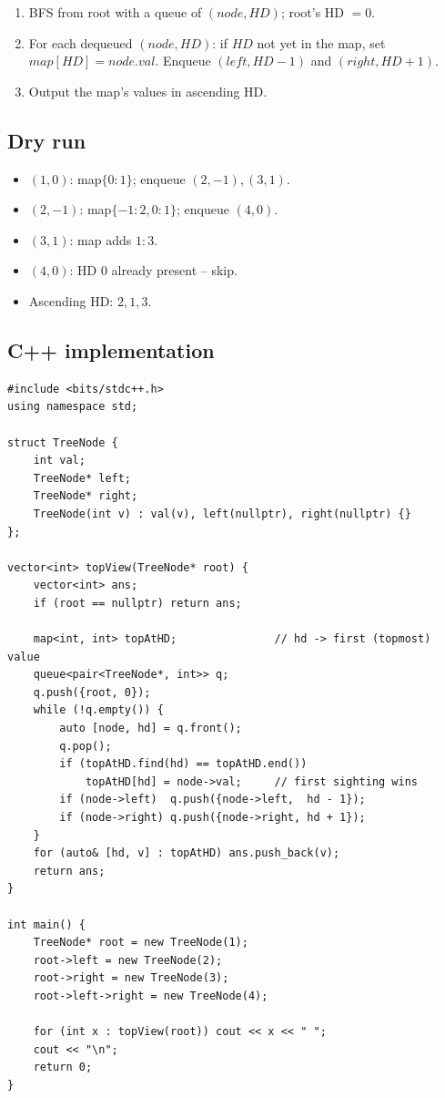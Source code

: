 \begin{enumerate}
  \item BFS from root with a queue of $(node, HD)$; root's HD $=0$.
  \item For each dequeued $(node, HD)$: if $HD$ not yet in the map, set
        $\textit{map}[HD]=node.val$. Enqueue $(left, HD-1)$ and
        $(right, HD+1)$.
  \item Output the map's values in ascending HD.
\end{enumerate}

\subsection*{Dry run}


\begin{itemize}
  \item $(1,0)$: map$\{0\!:\!1\}$; enqueue $(2,-1),(3,1)$.
  \item $(2,-1)$: map$\{-1\!:\!2,0\!:\!1\}$; enqueue $(4,0)$.
  \item $(3,1)$: map adds $1\!:\!3$.
  \item $(4,0)$: HD $0$ already present -- skip.
  \item Ascending HD: $2,1,3$.
\end{itemize}

\subsection*{C++ implementation}

\begin{lstlisting}
#include <bits/stdc++.h>
using namespace std;

struct TreeNode {
    int val;
    TreeNode* left;
    TreeNode* right;
    TreeNode(int v) : val(v), left(nullptr), right(nullptr) {}
};

vector<int> topView(TreeNode* root) {
    vector<int> ans;
    if (root == nullptr) return ans;

    map<int, int> topAtHD;               // hd -> first (topmost) value
    queue<pair<TreeNode*, int>> q;
    q.push({root, 0});
    while (!q.empty()) {
        auto [node, hd] = q.front();
        q.pop();
        if (topAtHD.find(hd) == topAtHD.end())
            topAtHD[hd] = node->val;     // first sighting wins
        if (node->left)  q.push({node->left,  hd - 1});
        if (node->right) q.push({node->right, hd + 1});
    }
    for (auto& [hd, v] : topAtHD) ans.push_back(v);
    return ans;
}

int main() {
    TreeNode* root = new TreeNode(1);
    root->left = new TreeNode(2);
    root->right = new TreeNode(3);
    root->left->right = new TreeNode(4);

    for (int x : topView(root)) cout << x << " ";
    cout << "\n";
    return 0;
}
\end{lstlisting}

